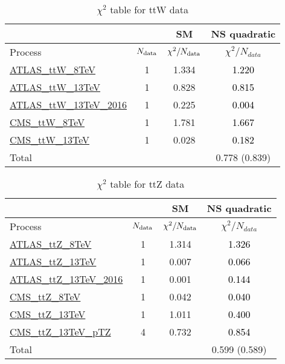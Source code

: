 \documentclass{article}
\begin{document}
\begin{table}[H]
\centering
\begin{tabular}{|l|c|c|c|}
\hline
 \multicolumn{2}{|c|}{} & SM& NS quadratic\\ \hline
Process & $N_{\rm data}$ & $\chi^ 2/N_{\rm data}$& $\chi^ 2/N_{data}$\\ \hline
\href{https://arxiv.org/abs/1509.05276}{ATLAS_ttW_8TeV} & 1 & 1.334 & \textcolor{black}{1.220} \\ \hline
\href{https://arxiv.org/abs/1609.01599}{ATLAS_ttW_13TeV} & 1 & 0.828 & \textcolor{black}{0.815} \\ \hline
\href{https://arxiv.org/abs/1901.03584}{ATLAS_ttW_13TeV_2016} & 1 & 0.225 & \textcolor{black}{0.004} \\ \hline
\href{https://arxiv.org/abs/1510.01131}{CMS_ttW_8TeV} & 1 & 1.781 & \textcolor{black}{1.667} \\ \hline
\href{https://arxiv.org/abs/1711.02547}{CMS_ttW_13TeV} & 1 & 0.028 & \textcolor{black}{0.182} \\ \hline
\hline Total & &  & 0.778 (0.839) \\ \hline
\end{tabular}
\caption{$\chi^2$ table for ttW data}
\end{table}
\begin{table}[H]
\centering
\begin{tabular}{|l|c|c|c|}
\hline
 \multicolumn{2}{|c|}{} & SM& NS quadratic\\ \hline
Process & $N_{\rm data}$ & $\chi^ 2/N_{\rm data}$& $\chi^ 2/N_{data}$\\ \hline
\href{https://arxiv.org/abs/1509.05276}{ATLAS_ttZ_8TeV} & 1 & 1.314 & \textcolor{black}{1.326} \\ \hline
\href{https://arxiv.org/abs/1609.01599}{ATLAS_ttZ_13TeV} & 1 & 0.007 & \textcolor{black}{0.066} \\ \hline
\href{https://arxiv.org/abs/1901.03584}{ATLAS_ttZ_13TeV_2016} & 1 & 0.001 & \textcolor{black}{0.144} \\ \hline
\href{https://arxiv.org/abs/1510.01131}{CMS_ttZ_8TeV} & 1 & 0.042 & \textcolor{black}{0.040} \\ \hline
\href{https://arxiv.org/abs/1711.02547}{CMS_ttZ_13TeV} & 1 & 1.011 & \textcolor{black}{0.400} \\ \hline
\href{https://arxiv.org/abs/1907.11270}{CMS_ttZ_13TeV_pTZ} & 4 & 0.732 & \textcolor{black}{0.854} \\ \hline
\hline Total & &  & 0.599 (0.589) \\ \hline
\end{tabular}
\caption{$\chi^2$ table for ttZ data}
\end{table}
\end{document}
